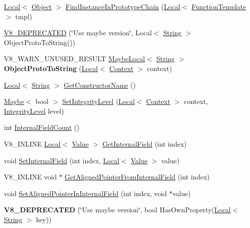 \begin{DoxyCompactItemize}
\item 
\hyperlink{classv8_1_1_local}{Local}$<$ \hyperlink{classv8_1_1_object}{Object} $>$ \hyperlink{classv8_1_1_object_abd62f72947a0ddad5ada4fbfbb0194ef}{Find\+Instance\+In\+Prototype\+Chain} (\hyperlink{classv8_1_1_local}{Local}$<$ \hyperlink{classv8_1_1_function_template}{Function\+Template} $>$ tmpl)
\item 
\hyperlink{classv8_1_1_object_a06bb9aab716e466b8fa0e0c3fbb8f5d7}{V8\+\_\+\+D\+E\+P\+R\+E\+C\+A\+T\+ED} (\char`\"{}Use maybe version\char`\"{}, Local$<$ \hyperlink{classv8_1_1_string}{String} $>$ Object\+Proto\+To\+String())
\item 
V8\+\_\+\+W\+A\+R\+N\+\_\+\+U\+N\+U\+S\+E\+D\+\_\+\+R\+E\+S\+U\+LT \hyperlink{classv8_1_1_maybe_local}{Maybe\+Local}$<$ \hyperlink{classv8_1_1_string}{String} $>$ {\bfseries Object\+Proto\+To\+String} (\hyperlink{classv8_1_1_local}{Local}$<$ \hyperlink{classv8_1_1_context}{Context} $>$ context)\hypertarget{classv8_1_1_object_a8e9c3e8be24b1d4ae1f943af261d45ae}{}\label{classv8_1_1_object_a8e9c3e8be24b1d4ae1f943af261d45ae}

\item 
\hyperlink{classv8_1_1_local}{Local}$<$ \hyperlink{classv8_1_1_string}{String} $>$ \hyperlink{classv8_1_1_object_adfa3382c230ccbd88f9be12e2512eab8}{Get\+Constructor\+Name} ()
\item 
\hyperlink{classv8_1_1_maybe}{Maybe}$<$ bool $>$ \hyperlink{classv8_1_1_object_aa13da0b73aea74f9a58250aa0677b73c}{Set\+Integrity\+Level} (\hyperlink{classv8_1_1_local}{Local}$<$ \hyperlink{classv8_1_1_context}{Context} $>$ context, \hyperlink{namespacev8_a02642d03ff1eecc2fd358626499c2e30}{Integrity\+Level} level)
\item 
int \hyperlink{classv8_1_1_object_aaec28576353eebe6fee113bce2718ecc}{Internal\+Field\+Count} ()
\item 
V8\+\_\+\+I\+N\+L\+I\+NE \hyperlink{classv8_1_1_local}{Local}$<$ \hyperlink{classv8_1_1_value}{Value} $>$ \hyperlink{classv8_1_1_object_aa3324fdf652d8ac3b2f27faa0559231d}{Get\+Internal\+Field} (int index)
\item 
void \hyperlink{classv8_1_1_object_aebf949a0592cebc144bb2f96bfb7ec72}{Set\+Internal\+Field} (int index, \hyperlink{classv8_1_1_local}{Local}$<$ \hyperlink{classv8_1_1_value}{Value} $>$ value)
\item 
V8\+\_\+\+I\+N\+L\+I\+NE void $\ast$ \hyperlink{classv8_1_1_object_a435f68bb7ef0f64dd522c5c910682448}{Get\+Aligned\+Pointer\+From\+Internal\+Field} (int index)
\item 
void \hyperlink{classv8_1_1_object_a0ccba69581f0b5e4e672bab90f26879b}{Set\+Aligned\+Pointer\+In\+Internal\+Field} (int index, void $\ast$value)
\item 
{\bfseries V8\+\_\+\+D\+E\+P\+R\+E\+C\+A\+T\+ED} (\char`\"{}Use maybe version\char`\"{}, bool Has\+Own\+Property(\hyperlink{classv8_1_1_local}{Local}$<$ \hyperlink{classv8_1_1_string}{String} $>$ key))\hypertarget{classv8_1_1_object_a332143937efdc58dac2d877ebeb5f8ef}{}\label{classv8_1_1_object_a332143937efdc58dac2d877ebeb5f8ef}


\end{DoxyCompactItemize}
